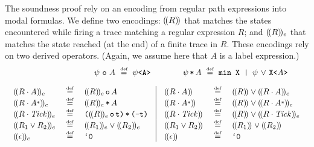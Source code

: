 \documentclass[a4paper]{scrartcl}
\newcommand{\interp}[2][{}]{(\kern-.5mm({#2})\kern-.5mm)_{#1}}
\newcommand{\eqdef}{\ensuremath{\overset{\text{\tiny def}}{=}}}
\newcommand{\tick}{\ensuremath{\mathit{Tick}}}
\newcommand{\kleene}{\ensuremath{\mathclose{\overset{*}{\ }}}}
\newcommand{\ltl}[1]{\texttt{#1}}
\begin{document}
The soundness proof rely on an encoding from regular path expressions
into modal formulas. We define two encodings: $\interp{R}$ that
matches the states encountered while firing a trace matching a regular
expression $R$; and $\interp[e]{R}$ that matches the state reached (at
the end) of a finite trace in $R$. These encodings rely on two derived
operators. (Again, we assume here that $A$ is a label expression.)
\[
\begin{array}[c]{l}
  \hfill {\psi \,\ltlo\, A  \ \eqdef\  \psi\ltl{<A>}}
  \hspace*{4em}
  {\psi \,\ltl{*}\, A \ \eqdef\ \ltl{min X | $\psi$\,\ltlor\,X<$A$>}}
  \hspace*{2em}\\[1em]


  \begin{array}[c]{lcl@{\quad}|@{\quad}lcl}


    \interp[e]{R \cdot A} & \eqdef & \interp[e]{R} \,\ltl{o}\, A &
    \interp{R \cdot A} & \eqdef & \interp{R} \vee \interp[e]{R
      \cdot A}\\

    \interp[e]{R \cdot A\kleene} & \ \eqdef\ & \interp[e]{R} \,\ltl{*}\, A &
    \interp{R \cdot A\kleene} & \ \eqdef\ & \interp{R} \vee \interp[e]{R \cdot A\kleene}\\
    


    \interp[e]{R \cdot \tick} & \ \eqdef\ &
    \ltl{(} \interp[e]{R} \ltl{\,o\,t)\,*\,(-t)} & 
    \interp{R \cdot \tick} & \ \eqdef\ &
    \interp{R} \vee \interp[e]{R \cdot \tick}\\

    \interp[e]{R_1 \vee R_2} & \ \eqdef\ &
    \interp[e]{R_1} \vee \interp[e]{R_2}  & 
    \interp{R_1 \vee R_2} & \ \eqdef\ &
    \interp{R_1} \vee \interp{R_2}\\

    \interp[e]{\epsilon} & \ \eqdef\ &
    \ltl{`0}
    & 
    \interp{\epsilon} & \ \eqdef\ &
    \ltl{`0}
  \end{array}\\
\end{array}
\]
\end{document}
